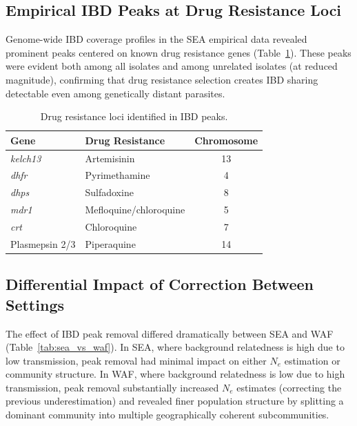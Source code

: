 \documentclass[11pt]{article}
\begin{document}
\subsection{Empirical IBD Peaks at Drug Resistance Loci}

Genome-wide IBD coverage profiles in the SEA empirical data revealed prominent peaks centered on known drug resistance genes (Table~\ref{tab:resistance_loci}). These peaks were evident both among all isolates and among unrelated isolates (at reduced magnitude), confirming that drug resistance selection creates IBD sharing detectable even among genetically distant parasites.

\begin{table}[htbp]
\centering
\caption{Drug resistance loci identified in IBD peaks.}
\label{tab:resistance_loci}
\begin{tabular}{llc}
\toprule
\textbf{Gene} & \textbf{Drug Resistance} & \textbf{Chromosome} \\
\midrule
\textit{kelch13} & Artemisinin & 13 \\
\textit{dhfr} & Pyrimethamine & 4 \\
\textit{dhps} & Sulfadoxine & 8 \\
\textit{mdr1} & Mefloquine/chloroquine & 5 \\
\textit{crt} & Chloroquine & 7 \\
Plasmepsin 2/3 & Piperaquine & 14 \\
\bottomrule
\end{tabular}
\end{table}

\subsection{Differential Impact of Correction Between Settings}

The effect of IBD peak removal differed dramatically between SEA and WAF (Table~\ref{tab:sea_vs_waf}). In SEA, where background relatedness is high due to low transmission, peak removal had minimal impact on either $N_e$ estimation or community structure. In WAF, where background relatedness is low due to high transmission, peak removal substantially increased $N_e$ estimates (correcting the previous underestimation) and revealed finer population structure by splitting a dominant community into multiple geographically coherent subcommunities.
\end{document}
